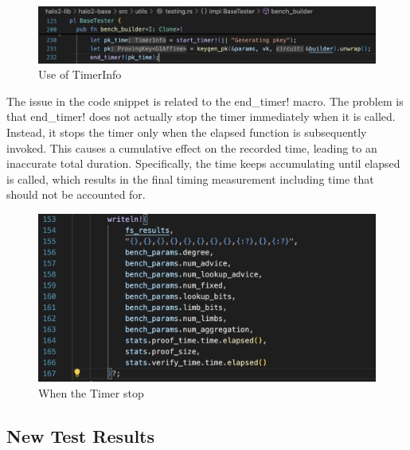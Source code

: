 \documentclass{article}
\begin{document}
\begin{figure}[H]
    \centering
    \includegraphics[width=1\linewidth]{bug1.png}
    \caption{Use of TimerInfo}
    \label{fig:enter-label}
\end{figure}

The issue in the code snippet is related to the end\_timer! macro. The problem is that end\_timer! does not actually stop the timer immediately when it is called. Instead, it stops the timer only when the elapsed function is subsequently invoked. This causes a cumulative effect on the recorded time, leading to an inaccurate total duration. Specifically, the time keeps accumulating until elapsed is called, which results in the final timing measurement including time that should not be accounted for.

\begin{figure}[H]
    \centering
    \includegraphics[width=1\linewidth]{bug2.png}
    \caption{When the Timer stop}
    \label{fig:enter-label}
\end{figure}

\subsection{New Test Results}
\end{document}
